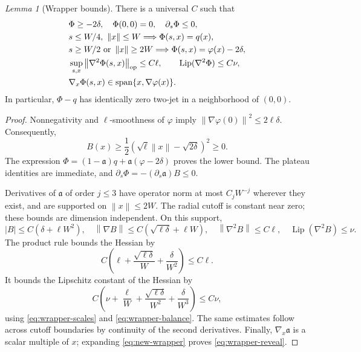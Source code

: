 \documentclass[11pt]{article}
\newtheorem{lemma}[theorem]{Lemma}
\theoremstyle{remark}
\newtheorem{lemma}[lemma]{Lemma}
\theoremstyle{remark}
\newcommand{\norm}[1]{\left\lVert#1\right\rVert}
\newcommand{\Lip}{\operatorname{Lip}}
\newcommand{\op}{\mathrm{op}}
\begin{document}
\begin{lemma}[Wrapper bounds]\label{lem:new-wrapper}
There is a universal $C$ such that
\begin{align}
 &\Phi\ge-2\delta,\quad \Phi(0,0)=0,\quad \partial_s\Phi\le0,\label{eq:wrapper-sign}\\
 &s\le W/4,\ \norm x\le W\Longrightarrow\Phi(s,x)=q(x),\label{eq:wrapper-inactive}\\
 &s\ge W/2\ \hbox{or}\ \norm x\ge2W
 \Longrightarrow\Phi(s,x)=\varphi(x)-2\delta,\label{eq:wrapper-active}\\
 &\sup_{s,x}\norm{\nabla^2\Phi(s,x)}_{\op}\le C\ell,
 \qquad \Lip(\nabla^2\Phi)\le C\nu,\label{eq:wrapper-both-smooth}\\
 &\nabla_x\Phi(s,x)\in\operatorname{span}\{x,\nabla\varphi(x)\}.
 \label{eq:wrapper-reveal}
\end{align}
In particular, $\Phi-q$ has identically zero two-jet in a neighborhood of $(0,0)$.
\end{lemma}
\begin{proof}
Nonnegativity and $\ell$-smoothness of $\varphi$ imply
$\norm{\nabla\varphi(0)}^2\le2\ell\delta$. Consequently,
\[
 B(x)\ge\frac12(\sqrt\ell\norm x-\sqrt{2\delta})^2\ge0.
\]
The expression $\Phi=(1-\mathfrak a)q+\mathfrak a(\varphi-2\delta)$ proves the lower bound. The plateau identities are immediate, and
$\partial_s\Phi=-(\partial_s\mathfrak a)B\le0$.

Derivatives of $\mathfrak a$ of order $j\le3$ have operator norm at most $C_jW^{-j}$ wherever they exist, and are supported on $\norm x\le2W$. The radial cutoff is constant near zero; these bounds are dimension independent. On this support,
\[
 |B|\le C(\delta+\ell W^2),\quad
 \norm{\nabla B}\le C(\sqrt{\ell\delta}+\ell W),\quad
 \norm{\nabla^2B}\le C\ell,\quad
 \Lip(\nabla^2B)\le\nu.
\]
The product rule bounds the Hessian by
\[
 C\left(\ell+\frac{\sqrt{\ell\delta}}W+\frac\delta{W^2}\right)\le C\ell.
\]
It bounds the Lipschitz constant of the Hessian by
\[
 C\left(\nu+\frac\ell W+
 \frac{\sqrt{\ell\delta}}{W^2}+\frac\delta{W^3}\right)\le C\nu,
\]
using \eqref{eq:wrapper-scales} and \eqref{eq:wrapper-balance}. The same estimates follow across cutoff boundaries by continuity of the second derivatives. Finally, $\nabla_x\mathfrak a$ is a scalar multiple of $x$; expanding \eqref{eq:new-wrapper} proves \eqref{eq:wrapper-reveal}.
\end{proof}
\end{document}
